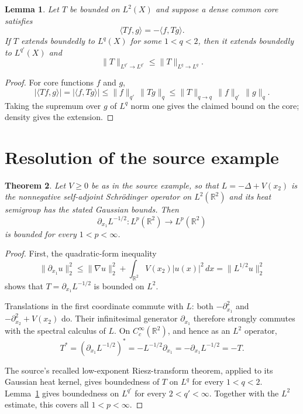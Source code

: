 \documentclass[11pt,a4paper]{article}
\newtheorem{theorem}{Theorem}
\newtheorem{lemma}[theorem]{Lemma}
\newcommand{\R}{\mathbb R}
\begin{document}
\begin{lemma}\label{lem:duality}
Let $T$ be bounded on $L^2(X)$ and suppose a dense common core satisfies
\[
 \langle Tf,g\rangle=-\langle f,Tg\rangle.
\]
If $T$ extends boundedly to $L^q(X)$ for some $1<q<2$, then it extends
boundedly to $L^{q'}(X)$ and
\[
 \|T\|_{L^{q'}\to L^{q'}}\leq \|T\|_{L^q\to L^q}.
\]
\end{lemma}

\begin{proof}
For core functions $f$ and $g$,
\[
 |\langle Tf,g\rangle|
   =|\langle f,Tg\rangle|
   \leq \|f\|_{q'}\,\|Tg\|_q
   \leq \|T\|_{q\to q}\,\|f\|_{q'}\,\|g\|_q.
\]
Taking the supremum over $g$ of $L^q$ norm one gives the claimed bound on
the core; density gives the extension.
\end{proof}

\section{Resolution of the source example}

\begin{theorem}\label{thm:main}
Let $V\geq0$ be as in the source example, so that
$L=-\Delta+V(x_2)$ is the nonnegative self-adjoint Schr\"odinger operator on
$L^2(\R^2)$ and its heat semigroup has the stated Gaussian bounds.  Then
\[
 \partial_{x_1}L^{-1/2}:L^p(\R^2)\longrightarrow L^p(\R^2)
\]
is bounded for every $1<p<\infty$.
\end{theorem}

\begin{proof}
First, the quadratic-form inequality
\[
 \|\partial_{x_1}u\|_2^2
 \leq \|\nabla u\|_2^2+\int_{\R^2}V(x_2)|u(x)|^2\,dx
 =\|L^{1/2}u\|_2^2
\]
shows that $T=\partial_{x_1}L^{-1/2}$ is bounded on $L^2$.

Translations in the first coordinate commute with $L$: both
$-\partial_{x_1}^2$ and $-\partial_{x_2}^2+V(x_2)$ do.  Their infinitesimal
generator $\partial_{x_1}$ therefore strongly commutes with the spectral
calculus of $L$.  On $C_c^\infty(\R^2)$, and hence as an $L^2$ operator,
\[
 T^*=(\partial_{x_1}L^{-1/2})^*
   =-L^{-1/2}\partial_{x_1}
   =-\partial_{x_1}L^{-1/2}=-T.
\]

The source's recalled low-exponent Riesz-transform theorem, applied to its
Gaussian heat kernel, gives boundedness of $T$ on $L^q$ for every
$1<q<2$.  Lemma~\ref{lem:duality} gives boundedness on $L^{q'}$ for every
$2<q'<\infty$.  Together with the $L^2$ estimate, this covers all
$1<p<\infty$.
\end{proof}
\end{document}
